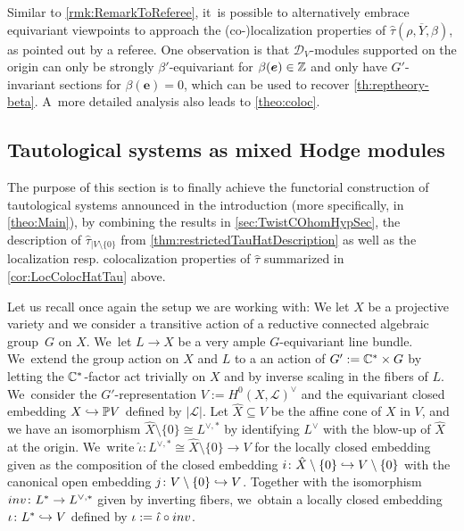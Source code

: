 \documentclass[11pt]{article}
\newcommand{\resp}{resp.\xspace}
\newcommand\hto{\mathrel{\lhook\joinrel\to}}
\newcommand{\bme}{{\boldsymbol{e}}}
\begin{document}
\begin{rmk}\label{rmk:RemarkRefColoc}
Similar to \cref{rmk:RemarkToReferee}, it~is possible to alternatively embrace equivariant viewpoints to approach the (co-)localization properties of $\hat\tau(\rho, \overline Y, \beta)$, as pointed out by a referee. One observation is that $\mathscr D_V$\nobreakdash-mod\-ules supported on the origin can only be strongly $\beta'$-equivariant for $\beta(\bme) \in \Z$ and only have $G'$-invariant sections for $\beta(\bme) = 0$, which can be used to recover \cref{th:reptheory-beta}. A~more detailed analysis also leads to \cref{theo:coloc}.
\end{rmk}

\subsection{Tautological systems as mixed Hodge modules}
\label{subsec:TautMHM}

The purpose of this section is to finally achieve the functorial construction of tautological systems
announced in the introduction (more specifically, in \cref{theo:Main}), by combining the results in
\cref{sec:TwistCOhomHypSec}, the description of $\hat\tau_{|V\setminus \{0\}}$ from \cref{thm:restrictedTauHatDescription} as well as the localization \resp colocalization properties of $\hat\tau$ summarized in \cref{cor:LocColocHatTau} above.

Let us recall once again the setup we are working with: We let $X$ be a projective variety and we consider a transitive action of a reductive connected algebraic group~$G$ on $X$. We~let $L \to X$ be a very ample $G$-equivariant line bundle. We~extend the group action on $X$ and $L$ to a an action of $G' := {\mathbb C}^* \times G$ by letting the ${\mathbb C}^*$-factor act trivially on $X$ and by inverse scaling in the fibers of $L$. We~consider the $G'$-representation $V:=H^0(X,\mathscr{L})^\vee$ and the equivariant closed embedding $X\hto \P V$ defined by $|\mathscr{L}|$.
Let $\hat{X}\subseteq V$ be the affine cone of $X$ in $V$, and we have an isomorphism $\hat{X} \setminus \{0\} \cong L^{\vee,*}$ by identifying $L^{\vee}$ with the blow-up of $\hat X$ at the origin. We~write $\hat\iota \colon L^{\vee,*} \cong \hat X \setminus \{0\} \to V$ for the locally closed embedding given as the composition of
the closed embedding $i \colon \hat{X}\setminus \{0\} \hto V\setminus \{0\}$ with the canonical open embedding
$j \colon V\setminus \{0\} \hto V$.
Together with the isomorphism $\textup{inv} \colon L^* \to L^{\vee,*}$ given by inverting fibers, we~obtain a locally closed embedding $\iota \colon L^* \hto V$ defined by $\iota:=\hat\iota\circ \textup{inv}$.
\end{document}
